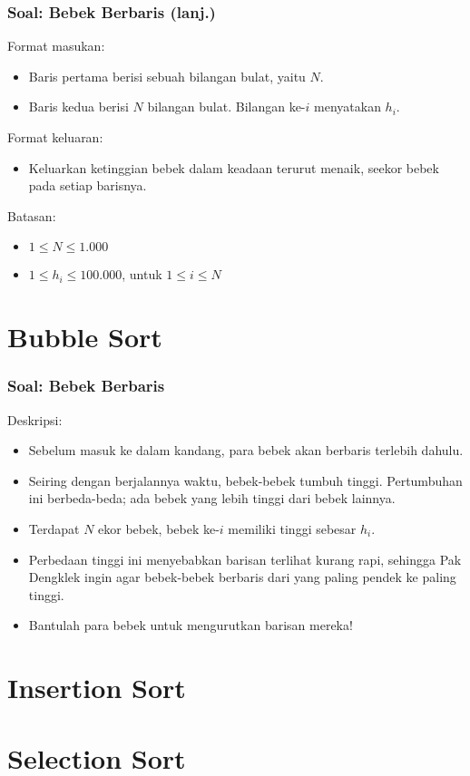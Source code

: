 \documentclass{beamer}
\begin{document}
\begin{frame}
\frametitle{Soal: Bebek Berbaris (lanj.)}
Format masukan:
\begin{itemize}
	\item Baris pertama berisi sebuah bilangan bulat, yaitu $N$.
	\item Baris kedua berisi $N$ bilangan bulat. Bilangan ke-$i$ menyatakan $h_i$.
\end{itemize}
Format keluaran:
\begin{itemize}
	\item Keluarkan ketinggian bebek dalam keadaan terurut menaik, seekor bebek pada setiap barisnya.
\end{itemize}
Batasan:
\begin{itemize}
	\item $1 \le N \le 1.000$
	\item $1 \le h_i \le 100.000$, untuk $1 \le i \le N$
\end{itemize}
\end{frame}

\section{Bubble Sort}
\frame{\sectionframe}

\begin{frame}
\frametitle{Soal: Bebek Berbaris}
Deskripsi:
\begin{itemize}
	\item Sebelum masuk ke dalam kandang, para bebek akan berbaris terlebih dahulu.
	\item Seiring dengan berjalannya waktu, bebek-bebek tumbuh tinggi. Pertumbuhan ini berbeda-beda; ada bebek yang lebih tinggi dari bebek lainnya.
	\item Terdapat $N$ ekor bebek, bebek ke-$i$ memiliki tinggi sebesar $h_i$.
	\item Perbedaan tinggi ini menyebabkan barisan terlihat kurang rapi, sehingga Pak Dengklek ingin agar bebek-bebek berbaris dari yang paling pendek ke paling tinggi.
	\item Bantulah para bebek untuk mengurutkan barisan mereka!
\end{itemize}
\end{frame}

\section{Insertion Sort}
\frame{\sectionframe}

\section{Selection Sort}
\frame{\sectionframe}
\end{document}
